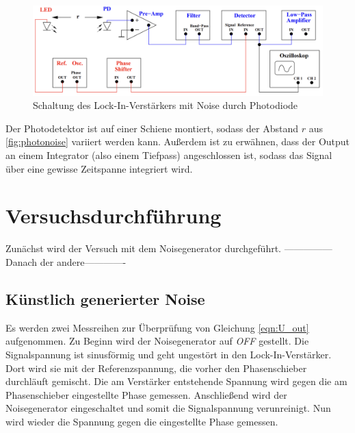 \begin{figure}[H]
    \includegraphics[width=\textwidth]{./content/Schaltung_Photodiode.png}
    \caption{Schaltung des Lock-In-Verstärkers mit Noise durch Photodiode \cite{Versuchsanleitung_v303}}
    \label{fig:photonoise}
\end{figure}

\noindent
Der Photodetektor ist auf einer Schiene montiert, sodass der Abstand $r$ aus \autoref{fig:photonoise} variiert werden kann.
Außerdem ist zu erwähnen, dass der Output an einem Integrator (also einem Tiefpass) angeschlossen ist, sodass das Signal über eine 
gewisse Zeitspanne integriert wird.


\section{Versuchsdurchführung}
Zunächst wird der Versuch mit dem Noisegenerator durchgeführt. ---------------Danach der andere-------------

\subsection{Künstlich generierter Noise}
\label{sec:durchf_kunst}
Es werden zwei Messreihen zur Überprüfung von Gleichung \eqref{eqn:U_out} aufgenommen. Zu Beginn wird der Noisegenerator auf \emph{OFF} gestellt.
Die Signalspannung ist sinusförmig und geht ungestört in den Lock-In-Verstärker. Dort wird sie mit der Referenzspannung, die vorher den 
Phasenschieber durchläuft gemischt. Die am Verstärker entstehende Spannung wird gegen die am Phasenschieber eingestellte Phase gemessen.
Anschließend wird der Noisegenerator eingeschaltet und somit die Signalspannung verunreinigt. Nun wird wieder die Spannung gegen die eingestellte 
Phase gemessen.

